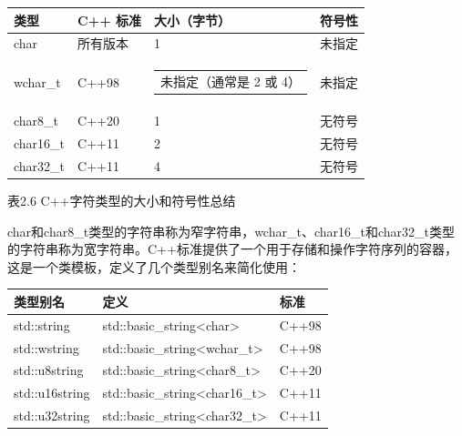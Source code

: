 \begin{longtable}{|l|l|l|l|}
\hline
\textbf{类型} & \textbf{C++ 标准} & \textbf{大小（字节）}                                                     & \textbf{符号性} \\ \hline
\endfirsthead
%
\endhead
%
char      & 所有版本 & 1 & 未指定 \\ \hline
wchar\_t      & C++98                 & \begin{tabular}[c]{@{}l@{}}未指定（通常是 2 或 4）\end{tabular} & 未指定   \\ \hline
char8\_t  & C++20        & 1 & 无符号    \\ \hline
char16\_t & C++11        & 2 & 无符号    \\ \hline
char32\_t & C++11        & 4 & 无符号    \\ \hline
\end{longtable}

\begin{center}
表2.6 C++字符类型的大小和符号性总结
\end{center}

char和char8\_t类型的字符串称为窄字符串，wchar\_t、char16\_t和char32\_t类型的字符串称为宽字符串。C++标准提供了一个用于存储和操作字符序列的容器，这是一个类模板，定义了几个类型别名来简化使用：

\begin{longtable}{|l|l|l|}
\hline
\textbf{类型别名}  & \textbf{定义}                                  & \textbf{标准} \\ \hline
\endfirsthead
%
\endhead
%
std::string    & std::basic\_string\textless{}char\textgreater{}      & C++98                 \\ \hline
std::wstring   & std::basic\_string\textless{}wchar\_t\textgreater{}  & C++98                 \\ \hline
std::u8string  & std::basic\_string\textless{}char8\_t\textgreater{}  & C++20                 \\ \hline
std::u16string & std::basic\_string\textless{}char16\_t\textgreater{} & C++11                 \\ \hline
std::u32string & std::basic\_string\textless{}char32\_t\textgreater{} & C++11                 \\ \hline
\end{longtable}

